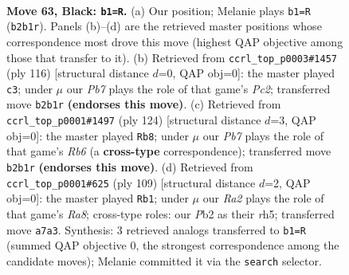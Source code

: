 \documentclass[11pt]{article}
\begin{document}
\clearpage

\begin{figure}[p]\centering
\begin{subfigure}{0.46\textwidth}\centering
\resizebox{\linewidth}{!}{%
\newchessgame
\chessboard[
  setfen={6K1/r7/8/7k/8/8/1p6/8 b - - 3 63},
  showmover=false,
  pgfstyle=straightmove, color=movearrow, markmove={b2-b1}
]}
\caption{}
\end{subfigure}\hfill
\begin{subfigure}{0.46\textwidth}\centering
\resizebox{\linewidth}{!}{%
\newchessgame
\chessboard[
  setfen={8/8/1k6/5R2/8/8/2P3K1/8 w - - 1 59},
  showmover=false,
  pgfstyle=straightmove, color=movearrow, markmove={c2-c3}
]}
\caption{}
\end{subfigure}
\\[4pt]
\begin{subfigure}{0.46\textwidth}\centering
\resizebox{\linewidth}{!}{%
\newchessgame
\chessboard[
  setfen={8/r7/1R6/8/6k1/8/3K4/8 w - - 5 63},
  showmover=false,
  pgfstyle=straightmove, color=movearrow, markmove={b6-b8}
]}
\caption{}
\end{subfigure}\hfill
\begin{subfigure}{0.46\textwidth}\centering
\resizebox{\linewidth}{!}{%
\newchessgame
\chessboard[
  setfen={2k5/8/8/7R/8/8/3K4/r7 b - - 11 55},
  showmover=false,
  pgfstyle=straightmove, color=movearrow, markmove={a1-b1}
]}
\caption{}
\end{subfigure}
\caption{\textbf{Move 63, Black: \texttt{b1=R}.} (a) Our position; Melanie plays \texttt{b1=R} (\texttt{b2b1r}). Panels (b)--(d) are the retrieved master positions whose correspondence most drove this move (highest QAP objective among those that transfer to it). (b) Retrieved from \texttt{ccrl\_top\_p0003\#1457} (ply 116) [structural distance $d$=0, QAP obj=0]: the master played \texttt{c3}; under $\mu$ our \emph{Pb7} plays the role of that game's \emph{Pc2}; transferred move \texttt{b2b1r} \textbf{(endorses this move)}. (c) Retrieved from \texttt{ccrl\_top\_p0001\#1497} (ply 124) [structural distance $d$=3, QAP obj=0]: the master played \texttt{Rb8}; under $\mu$ our \emph{Pb7} plays the role of that game's \emph{Rb6} (a \textbf{cross-type} correspondence); transferred move \texttt{b2b1r} \textbf{(endorses this move)}. (d) Retrieved from \texttt{ccrl\_top\_p0001\#625} (ply 109) [structural distance $d$=2, QAP obj=0]: the master played \texttt{Rb1}; under $\mu$ our \emph{Ra2} plays the role of that game's \emph{Ra8}; cross-type roles: our \emph{P}b2 as their \emph{r}h5; transferred move \texttt{a7a3}. Synthesis: 3 retrieved analogs transferred to \texttt{b1=R} (summed QAP objective 0, the strongest correspondence among the candidate moves); Melanie committed it via the \texttt{search} selector.}
\label{fig:thought-m125}
\end{figure}
\end{document}
